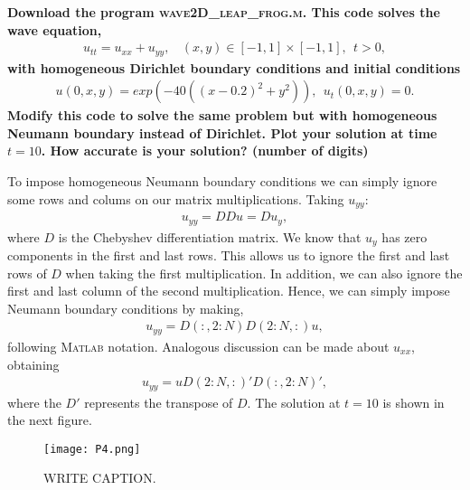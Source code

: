 \textbf{Download the program \textsc{wave2D\_leap\_frog.m}. This code solves the wave equation,
\begin{align*}
u_{tt}=u_{xx}+u_{yy},~~~~(x,y)\in [-1,1]\times [-1,1],~~t>0,
\end{align*}
with homogeneous Dirichlet boundary conditions and initial conditions
\begin{align*}
u(0,x,y) = exp(-40((x−0.2)^2+y^2)),~~ u_t(0, x, y) = 0.
\end{align*}
Modify this code to solve the same problem but with homogeneous Neumann boundary instead of Dirichlet. Plot your solution at time $t= 10$. How accurate is your solution? (number of digits)
}
\newline

To impose homogeneous Neumann boundary conditions we can simply ignore some rows and colums on our matrix multiplications. Taking $u_{yy}$:
\begin{align*}
u_{yy} = DDu = Du_y,
\end{align*}
where $D$ is the Chebyshev differentiation matrix. We know that $u_y$ has zero components in the first and last rows. This allows us to ignore the first and last rows of $D$ when taking the first multiplication. In addition, we can also ignore the first and last column of the second multiplication. Hence, we can simply impose Neumann boundary conditions by making,
\begin{align*}
u_{yy} = D(:,2:N)D(2:N,:)u,
\end{align*}
following \textsc{Matlab} notation. Analogous discussion can be made about $u_{xx}$, obtaining
\begin{align*}
u_{yy} = uD(2:N,:)'D(:,2:N)',
\end{align*}
where the $D'$ represents the transpose of $D$. The solution at $t=10$ is shown in the next figure.

\begin{figure}[H]
\centering
\texttt{[image: P4.png]}\caption{WRITE CAPTION.}
\end{figure}

